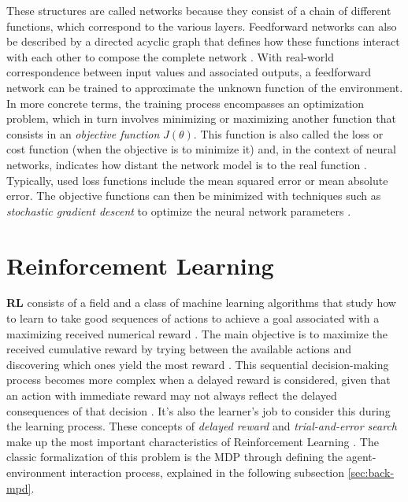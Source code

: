 These structures are called networks because they consist of a chain of different functions, which correspond to the various layers. Feedforward networks can also be described by a directed acyclic graph that defines how these functions interact with each other to compose the complete network \cite{ goodfellowDeepLearning2016}. 
With real-world correspondence between input values and associated outputs, a feedforward network can be trained to approximate the unknown function of the environment. In more concrete terms, the training process encompasses an optimization problem,  which in turn involves minimizing or maximizing another function that consists in an \textit{objective function} $J(\theta)$. This function is also called the loss or cost function (when the objective is to minimize it) and, in the context of neural networks, indicates how distant the network model is to the real function \cite{goodfellowDeepLearning2016}. Typically, used loss functions include the mean squared error or mean absolute error. The objective functions can then be minimized with techniques such as \textit{stochastic gradient descent} to optimize the neural network parameters \cite{charniakIntroductionDeepLearning2018, goodfellowDeepLearning2016}. 


\section{Reinforcement Learning} \label{sec:back-rl}

\textbf{\acf{RL}} consists of a field and a class of machine learning algorithms that study how to learn to take good sequences of actions to achieve a goal associated with a maximizing received numerical reward \cite{brunskillCS234ReinforcementLearning}. The main objective is to maximize the received cumulative reward by trying between the available actions and discovering which ones yield the most reward \cite{suttonReinforcementLearningIntroduction2014}. This sequential decision-making process becomes more complex when a delayed reward is considered, given that an action with immediate reward may not always reflect the delayed consequences of that decision \cite{suttonReinforcementLearningIntroduction2014}. It's also the learner's job to consider this during the learning process. These concepts of \textit{delayed reward} and \textit{trial-and-error search} make up the most important characteristics of Reinforcement Learning \cite{suttonReinforcementLearningIntroduction2014}. The classic formalization of this problem is the \ac{MDP} through defining the agent-environment interaction process, explained in the following subsection \ref{sec:back-mpd}. \par 

